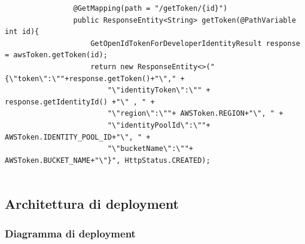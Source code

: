 \documentclass[12pt]{article}
\begin{document}
\begin{itemize}
\begin{lstlisting}
				@GetMapping(path = "/getToken/{id}")
				public ResponseEntity<String> getToken(@PathVariable int id){
					GetOpenIdTokenForDeveloperIdentityResult response = awsToken.getToken(id);
					return new ResponseEntity<>("{\"token\":\""+response.getToken()+"\"," +
						"\"identityToken\":\"" + response.getIdentityId() +"\" , " +
						"\"region\":\""+ AWSToken.REGION+"\", " +
						"\"identityPoolId\":\""+ AWSToken.IDENTITY_POOL_ID+"\", " +
						"\"bucketName\":\""+ AWSToken.BUCKET_NAME+"\"}", HttpStatus.CREATED);
					
				\end{lstlisting}
				
			\end{itemize}
			
			\subsection{Architettura di deployment}
			\subsubsection{Diagramma di deployment}
\end{document}
